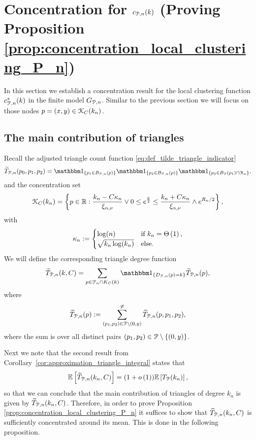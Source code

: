 \section{Concentration for $c_{{\mathcal P}, n}(k)$ (Proving Proposition \ref{prop:concentration_local_clustering_P_n})}
\label{sec:concentration_c_P_n}

In this section we establish a concentration result for the local clustering function $c_{{\mathcal P}, n}^\ast(k)$ in the finite model $G_{{\mathcal P},n}$. Similar to the previous section we will focus on those nodes $p = (x,y) \in {\mathcal K}_{C}(k_n)$.

\subsection{The main contribution of triangles}

Recall the adjusted triangle count function \eqref{eq:def_tilde_triangle_indicator}
\[
	\widetilde{T}_{\Pcal,n}(p_0,p_1,p_2) = \ind{p_1 \in B_{\Pcal,n}(p)}\ind{p_2 \in B_{\Pcal,n}(p)}\ind{p_2 \in B_{\Pcal}(p_1) \cap \Rcal_n}.
\]
and the concentration set
\[
	{\mathcal K}_C(k_n) = \left\{p \in {\ensuremath{\mathbb R}} : \frac{k_n - C \kappa_n}{\xi_{\alpha,\nu}} \vee 0 \le e^{\frac{y}{2}}
		\le \frac{k_n + C \kappa_n}{\xi_{\alpha,\nu}} \wedge e^{R_n/2} \right\},
\]
with
\[
	\kappa_n := \begin{cases}
		\log(n) &\mbox{if } k_n = \Theta\left(1\right),\\
		\sqrt{k_n \log(k_n)} &\mbox{else.}
	\end{cases}
\]
We will define the corresponding triangle degree function
\begin{equation}\label{eq:def_degree_triangle_count_in_K}
	\widetilde{T}_{\Pcal,n}(k, C) = \sum_{p \in \Pcal_n \cap K_C(k)} \ind{D_{\Pcal,n}(p) = k} \widetilde{T}_{\Pcal,n}(p),
\end{equation}
where
\[
	\widetilde{T}_{{\mathcal P},n}(p) := \sum_{(p_1, p_2) \in {\mathcal P}\setminus (0,y)}^{\ne} \widetilde{T}_{{\mathcal P},n}(p,p_1,p_2),
\]
where the sum is over all distinct pairs $(p_1, p_2) \in {\mathcal P} \setminus \{(0,y)\}$.

Next we note that the second result from Corollary~\ref{cor:approximation_triangle_integral} states that
\begin{equation}\label{eq:asymptotic_equivalence_contraint_triangle_count}
	\mathbb{E}\left[\widetilde{T}_{{\mathcal P},n}(k_n,C)\right] = (1+o\left(1\right))\mathbb{E}\left[T_{{\mathcal P}}(k_n)\right],
\end{equation}
so that we can conclude that the main contribution of triangles of degree $k_n$ is given by $\widetilde{T}_{{\mathcal P},n}(k_n, C)$. Therefore, in order to prove Proposition \ref{prop:concentration_local_clustering_P_n} it suffices to show that $\widetilde{T}_{{\mathcal P},n}(k_n,C)$ is sufficiently concentrated around its mean. This is done in the following proposition.

